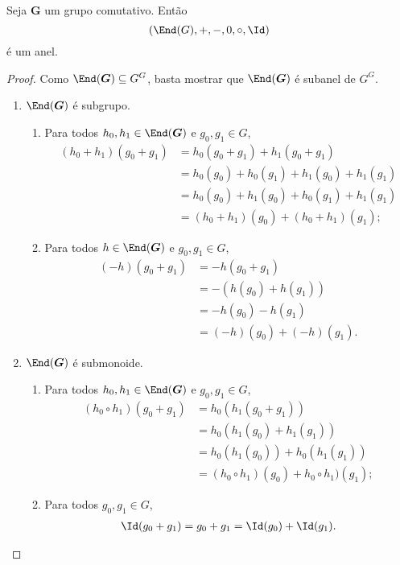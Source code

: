\begin{prop}
Seja $\bm G$ um grupo comutativo. Então
	\begin{equation*}
	(\End(G),+,-,0,\circ,\Id)
	\end{equation*}
é um anel.
\end{prop}
\begin{proof}
Como $\End(\bm G) \subseteq G^G$, basta mostrar que $\End(\bm G)$ é subanel de $G^G$.
	\begin{enumerate}
	\item $\End(\bm G)$ é subgrupo.
		\begin{enumerate}
		\item Para todos $h_0,h_1 \in \End(\bm G)$ e $g_0,g_1 \in G$,
			\begin{align*}
			(h_0+h_1)(g_0+g_1) &= h_0(g_0+g_1) + h_1(g_0+g_1) \\
				&= h_0(g_0) + h_0(g_1) + h_1(g_0) + h_1(g_1) \\
				&= h_0(g_0) + h_1(g_0) + h_0(g_1) + h_1(g_1) \\
				&= (h_0 + h_1)(g_0) + (h_0 + h_1)(g_1);
			\end{align*}
		\item Para todos $h \in \End(\bm G)$ e $g_0,g_1 \in G$,
			\begin{align*}
			(-h)(g_0+g_1) &= -h(g_0+g_1) \\
				&= -(h(g_0)+h(g_1)) \\
				&= -h(g_0)-h(g_1) \\
				&= (-h)(g_0)+(-h)(g_1).
			\end{align*}
		\end{enumerate}
	\item $\End(\bm G)$ é submonoide.
		\begin{enumerate}
		\item Para todos $h_0,h_1 \in \End(\bm G)$ e $g_0,g_1 \in G$,
			\begin{align*}
			(h_0 \circ h_1)(g_0+g_1) &= h_0(h_1(g_0+g_1)) \\
				&= h_0(h_1(g_0)+h_1(g_1)) \\
				&= h_0(h_1(g_0))+h_0(h_1(g_1)) \\
				&= (h_0 \circ h_1)(g_0)+h_0 \circ h_1)(g_1);
			\end{align*}
		\item Para todos $g_0,g_1 \in G$,
			\begin{align*}
			\Id(g_0+g_1) = g_0+g_1 = \Id(g_0)+\Id(g_1).
			\end{align*}
		\end{enumerate}
	\end{enumerate}
\end{proof}


